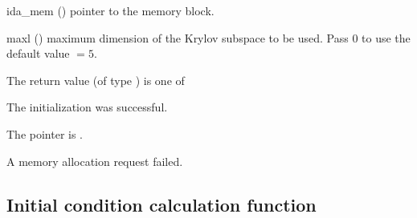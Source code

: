 {
  \begin{args}
  \item[ida\_mem] ()
    pointer to the {\ida} memory block.
  \item[maxl] ()
    maximum dimension of the Krylov subspace to be used. Pass $0$ to use the 
    default value $=5$.
  \end{args}
}
{
  The return value  (of type ) is one of
  \begin{args}
  \item[\Id{IDASPILS\_SUCCESS}] 
    The {\idasptfqmr} initialization was successful.
  \item[\Id{IDASPILS\_MEM\_NULL}]
    The  pointer is .
  \item[\Id{IDASPILS\_MEM\_FAIL}]
    A memory allocation request failed.
  \end{args}
}
{}


\subsection{Initial condition calculation function}\label{ss:idacalcic}

